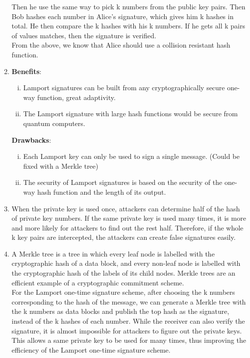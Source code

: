 \documentclass[12pt, a4paper]{article}
\begin{document}
\begin{enumerate}
          Then he use the same way to pick k numbers from the public key pairs. 
          Then Bob hashes each number in Alice's signature, which gives him k hashes in total. 
          He then compare the k hashes with his k numbers. If he gets all k pairs of values matches, 
          then the signature is verified.\\
          From the above, we know that Alice should use a collision resistant hash function.
    \item \textbf{Benefits}:
          \begin{enumerate}[(i)]
              \item Lamport signatures can be built from any cryptographically secure one-way function, great adaptivity.
              \item The Lamport signature with large hash functions would be secure from quantum computers.
          \end{enumerate}
          \textbf{Drawbacks}:
          \begin{enumerate}[(i)]
              \item Each Lamport key can only be used to sign a single message. (Could be fixed with a Merkle tree)
              \item The security of Lamport signatures is based on the security of the one-way hash function and the length of its output.
          \end{enumerate}
          
    \item When the private key is used once, attackers can determine half of the hash of private key numbers. 
          If the same private key is used many times, it is more and more likely for attackers to find out the rest half. 
          Therefore, if the whole k key pairs are intercepted, the attackers can create false signatures easily.
    \item A Merkle tree is a tree in which every leaf node is labelled with the cryptographic hash of a data block, 
          and every non-leaf node is labelled with the cryptographic hash of the labels of its child nodes. 
          Merkle trees are an efficient example of a cryptographic commitment scheme.\\
          For the Lamport one-time signature scheme, after choosing the k numbers corresponding to the hash of the message, 
          we can generate a Merkle tree with the k numbers as data blocks and publish the top hash as the signature, 
          instead of the k hashes of each number. While the receiver can also verify the signature, 
          it is almost impossible for attackers to figure out the private keys. 
          This allows a same private key to be used for many times, 
          thus improving the efficiency of the Lamport one-time signature scheme. 
          
\end{enumerate}
\end{document}
